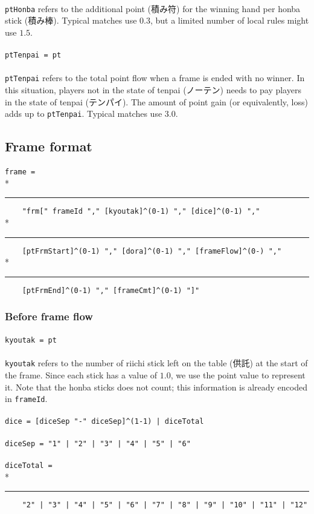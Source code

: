 \documentclass[%
	a4paper%
	,10pt%
	,twoside%
	,notitlepage%
]{article}%
\newcommand*{\ruleSymbol}{\textjapanese{⚠}}%
\newcommand*{\ruleMargin}{\marginpar{\flushright{}\ruleSymbol{}}}%
\newcommand*{\rulePar}{\paragraph*{\ruleMargin{}}}%
\newcommand*{\indentRule}{\rule{10pt}{0pt}}%
\begin{document}
			\paragraph*{}\lstinline/ptHonba/ refers to the additional point (\textjapanese{積み符}) for the winning hand per honba stick (\textjapanese{積み棒}). Typical matches use $0.3$, but a limited number of local rules might use $1.5$. %
			\rulePar{}\lstinline/ptTenpai = pt/%
			\paragraph*{}\lstinline/ptTenpai/ refers to the total point flow when a frame is ended with no winner. In this situation, players not in the state of tenpai (\textjapanese{ノーテン}) needs to pay players in the state of tenpai (\textjapanese{テンパイ}). The amount of point gain (or equivalently, loss) adds up to \lstinline/ptTenpai/. Typical matches use $3.0$. %
	\subsection{Frame format}\label{subsec:frame}%
		\rulePar{}\lstinline/frame = /\\*{}%
		\indentRule{}\lstinline/    "frm[" frameId "," [kyoutak]^(0-1) "," [dice]^(0-1) "," /\\*{}%
		\indentRule{}\lstinline/    [ptFrmStart]^(0-1) "," [dora]^(0-1) "," [frameFlow]^(0-) "," /\\*{}%
		\indentRule{}\lstinline/    [ptFrmEnd]^(0-1) "," [frameCmt]^(0-1) "]"/%
		\subsubsection{Before frame flow}\label{subsubsec:prefrmflow}%
			\rulePar{}\lstinline/kyoutak = pt/%
			\paragraph*{}\lstinline/kyoutak/ refers to the number of riichi stick left on the table (\textjapanese{供託}) at the start of the frame. Since each stick has a value of $1.0$, we use the point value to represent it. Note that the honba sticks does not count; this information is already encoded in \lstinline/frameId/. %
			\rulePar{}\lstinline/dice = [diceSep "-" diceSep]^(1-1) | diceTotal/%
			\rulePar{}\lstinline/diceSep = "1" | "2" | "3" | "4" | "5" | "6"/%
			\rulePar{}\lstinline/diceTotal = /\\*{}%
			\indentRule{}\lstinline/    "2" | "3" | "4" | "5" | "6" | "7" | "8" | "9" | "10" | "11" | "12" /%
\end{document}
